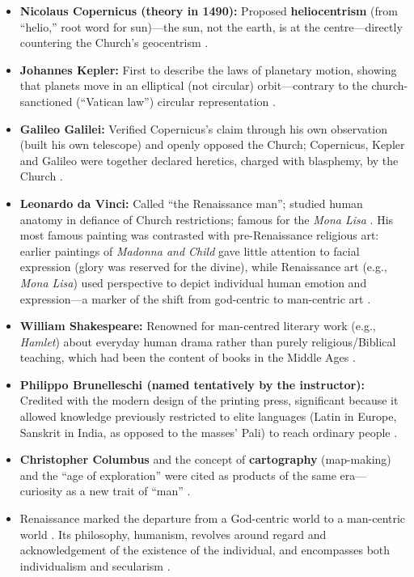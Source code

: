 \begin{ExampleBox}
\begin{itemize}
    \item \textbf{Nicolaus Copernicus (theory in 1490):} Proposed \textbf{heliocentrism} (from ``helio,'' root word for sun)---the sun, not the earth, is at the centre---directly countering the Church's geocentrism .
    \item \textbf{Johannes Kepler:} First to describe the laws of planetary motion, showing that planets move in an elliptical (not circular) orbit---contrary to the church-sanctioned (``Vatican law'') circular representation .
    \item \textbf{Galileo Galilei:} Verified Copernicus's claim through his own observation (built his own telescope) and openly opposed the Church; Copernicus, Kepler and Galileo were together declared heretics, charged with blasphemy, by the Church .
    \item \textbf{Leonardo da Vinci:} Called ``the Renaissance man''; studied human anatomy in defiance of Church restrictions; famous for the \textit{Mona Lisa} . His most famous painting was contrasted with pre-Renaissance religious art: earlier paintings of \textit{Madonna and Child} gave little attention to facial expression (glory was reserved for the divine), while Renaissance art (e.g., \textit{Mona Lisa}) used perspective to depict individual human emotion and expression---a marker of the shift from god-centric to man-centric art .
    \item \textbf{William Shakespeare:} Renowned for man-centred literary work (e.g., \textit{Hamlet}) about everyday human drama rather than purely religious/Biblical teaching, which had been the content of books in the Middle Ages .
    \item \textbf{Philippo Brunelleschi (named tentatively by the instructor):} Credited with the modern design of the printing press, significant because it allowed knowledge previously restricted to elite languages (Latin in Europe, Sanskrit in India, as opposed to the masses' Pali) to reach ordinary people .
    \item \textbf{Christopher Columbus} and the concept of \textbf{cartography} (map-making) and the ``age of exploration'' were cited as products of the same era---curiosity as a new trait of ``man'' .
\end{itemize}
\end{ExampleBox}

\begin{CriticalPoint}
\begin{itemize}
    \item Renaissance marked the departure from a God-centric world to a man-centric world . Its philosophy, humanism, revolves around regard and acknowledgement of the existence of the individual, and encompasses both individualism and secularism .
\end{itemize}
\end{CriticalPoint}


